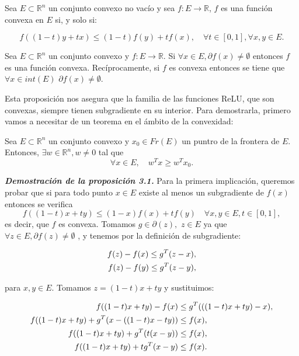\begin{definicion}
    Sea $E \subset \mathbb{R}^n$ un conjunto convexo no vacío y sea $f:E \rightarrow \mathbb{R}$, $f$ es una función convexa en $E$ si, y solo si:

    $$f( (1-t)y + tx) \leq (1-t) f(y) + tf(x), \quad \forall t \in [0,1], \forall x,y \in E.$$
\end{definicion}

\begin{proposicion}
\label{prop:subgrad}
    Sea $E \subset \mathbb{R}^n$ un conjunto convexo y $f:E \rightarrow \mathbb{R}$. Si $\forall x \in E, \partial f(x) \neq \emptyset$ entonces $f$ es una función convexa. Recíprocamente, si $f$ es convexa  entonces se tiene que $\forall x \in int(E)$ $\partial f(x) \neq \emptyset$.
\end{proposicion}

Esta proposición nos asegura que la familia de las funciones ReLU, que son convexas, siempre tienen subgradiente en su interior. Para demostrarla, primero vamos a necesitar de un teorema en el ámbito de la convexidad:

\begin{teorema}
    Sea $E \subset \mathbb{R}^n$ un conjunto convexo y $x_0 \in Fr(E)$ un puntro de la frontera de $E$. Entonces, $\exists w \in \mathbb{R}^n, w \neq 0$ tal que
    $$\forall x \in E, \quad w^Tx \geq w^T x_0.$$
\end{teorema}

\vspace{1cm}


\textbf{\textit{Demostración de la proposición 3.1.}}
Para la primera implicación, queremos probar que si para todo punto $x \in E$ existe al menos un subgradiente de $f(x)$ entonces se verifica
$$f((1-t)x+ty) \leq (1-x)f(x)+tf(y) \quad \forall x,y \in E, t \in [0,1],$$
es decir, que $f$ es convexa. Tomamos $g \in \partial(z),$ $z \in E$ ya que $\forall z \in E,  \partial f(z) \neq \emptyset $ , y tenemos por la definición de subgradiente:

\begin{align}
	f(z) - f(x) \leq g^T(z-x), \notag \\
	f(z) - f(y) \leq g^T(z-y), \label{eq:des2}
\end{align}

para $x,y \in E$. Tomamos $z=(1-t)x + ty$ y sustituimos:

\begin{align}	
	f((1-t)x + ty) - f(x) &\leq g^T(((1-t)x + ty)-x), \notag \\
	f((1-t)x + ty) + g^T(x - ((1-t)x-ty)) &\leq f(x), \notag \\
	f((1-t)x + ty) + g^T(t(x-y)) &\leq f(x), \notag \\
	f((1-t)x + ty) + tg^T(x-y) &\leq f(x). \label{proof1:f(x)}
\end{align}



